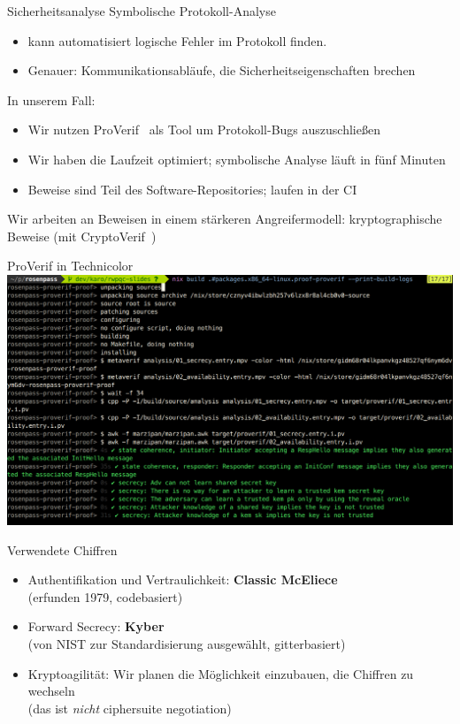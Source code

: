\documentclass{rosenpass-beamer}
\begin{document}
\begin{frame}{Sicherheitsanalyse}
  Symbolische Protokoll-Analyse
	\begin{itemize}
		\item kann automatisiert logische Fehler im Protokoll finden.
		\item Genauer: Kommunikationsabläufe, die Sicherheitseigenschaften brechen
\end{itemize}

In unserem Fall:
  \begin{itemize}
    \item Wir nutzen ProVerif~\cite{proverif} als Tool um Protokoll-Bugs auszuschließen
    \item Wir haben die Laufzeit optimiert; symbolische Analyse läuft in fünf Minuten
    \item Beweise sind Teil des Software-Repositories; laufen in der CI
  \end{itemize}

	Wir arbeiten an Beweisen in einem stärkeren Angreifermodell: kryptographische Beweise (mit CryptoVerif~\cite{cryptoverif})
\end{frame}

\begin{frame}{ProVerif in Technicolor}
  \includegraphics[height=.9\textheight]{assets/2023-03-20-symbolic-analysis-screenshot.png}
\end{frame}

  

\begin{frame}{Verwendete Chiffren}
  \begin{itemize}
    \item Authentifikation und Vertraulichkeit: \textbf{Classic McEliece}\\
	    (erfunden 1979, codebasiert)
    \item Forward Secrecy: \textbf{Kyber}\\
	    (von NIST zur Standardisierung ausgewählt, gitterbasiert)
    \item Kryptoagilität: Wir planen die Möglichkeit einzubauen, die Chiffren zu wechseln\\
	    (das ist \emph{nicht} ciphersuite negotiation)
  \end{itemize}
\end{frame}
\end{document}

